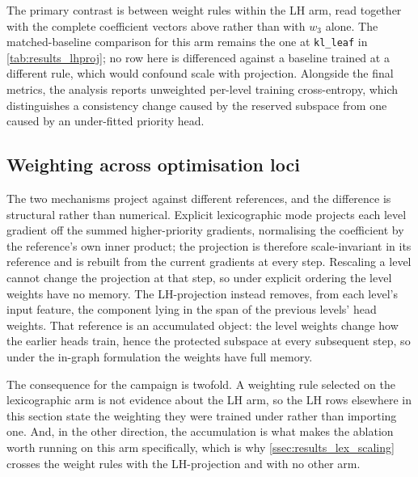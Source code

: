 The primary contrast is between weight rules within the LH arm, read together
with the complete coefficient vectors above rather than with $w_3$ alone. The
matched-baseline comparison for this arm remains the one at \texttt{kl\_leaf} in
\cref{tab:results_lhproj}; no row here is differenced against a baseline trained
at a different rule, which would confound scale with projection. Alongside the
final metrics, the analysis reports unweighted per-level training cross-entropy,
which distinguishes a consistency change caused by the reserved subspace from one
caused by an under-fitted priority head.

\subsection{Weighting across optimisation loci}
\label{ssec:results_lhproj_weight_transfer}

The two mechanisms project against different references, and the difference is
structural rather than numerical. Explicit lexicographic mode projects each level
gradient off the summed higher-priority gradients, normalising the coefficient by
the reference's own inner product; the projection is therefore scale-invariant in
its reference and is rebuilt from the current gradients at every step. Rescaling
a level cannot change the projection at that step, so under explicit ordering the
level weights have no memory. The LH-projection instead removes, from each
level's input feature, the component lying in the span of the previous levels'
head weights. That reference is an accumulated object: the level weights change
how the earlier heads train, hence the protected subspace at every subsequent
step, so under the in-graph formulation the weights have full memory.

The consequence for the campaign is twofold. A weighting rule selected on the
lexicographic arm is not evidence about the LH arm, so the LH rows elsewhere in
this section state the weighting they were trained under rather than importing
one. And, in the other direction, the accumulation is what makes the ablation
worth running on this arm specifically, which is why
\cref{ssec:results_lex_scaling} crosses the weight rules with the LH-projection
and with no other arm.


